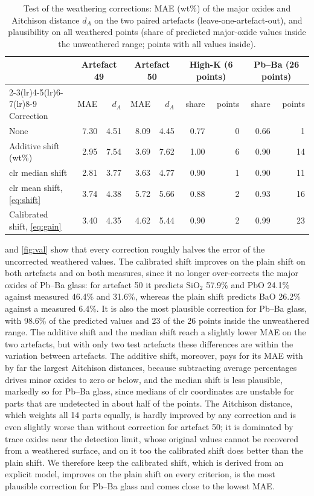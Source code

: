 \documentclass[11pt,a4paper]{article}
\newcommand{\ox}[1]{\ensuremath{\mathrm{#1}}}
\begin{document}
\begin{table}[ht]
\centering
\caption{Test of the weathering corrections: MAE (wt\%) of the major oxides and Aitchison distance $d_A$ on the two paired artefacts (leave-one-artefact-out), and plausibility on all weathered points (share of predicted major-oxide values inside the unweathered range; points with all values inside).}\label{tab:val}
\small
\begin{tabular}{lrrrrrrrr}
\toprule
& \multicolumn{2}{c}{Artefact 49} & \multicolumn{2}{c}{Artefact 50} & \multicolumn{2}{c}{High-K (6 points)} & \multicolumn{2}{c}{Pb--Ba (26 points)} \\
\cmidrule(lr){2-3}\cmidrule(lr){4-5}\cmidrule(lr){6-7}\cmidrule(lr){8-9}
Correction & MAE & $d_A$ & MAE & $d_A$ & share & points & share & points \\
\midrule
None & 7.30 & 4.51 & 8.09 & 4.45 & 0.77 & 0 & 0.66 & 1 \\
Additive shift (wt\%) & 2.95 & 7.54 & 3.69 & 7.62 & 1.00 & 6 & 0.90 & 14 \\
clr median shift & 2.81 & 3.77 & 3.63 & 4.77 & 0.90 & 1 & 0.90 & 11 \\
clr mean shift, \cref{eq:shift} & 3.74 & 4.38 & 5.72 & 5.66 & 0.88 & 2 & 0.93 & 16 \\
Calibrated shift, \cref{eq:gain} & 3.40 & 4.35 & 4.62 & 5.44 & 0.90 & 2 & 0.99 & 23 \\
\bottomrule
\end{tabular}
\end{table}

 and \cref{fig:val} show that every correction roughly halves the error of the uncorrected weathered values.
The calibrated shift improves on the plain shift on both artefacts and on both measures, since it no longer over-corrects the major oxides of Pb--Ba glass: for artefact 50 it predicts \ox{SiO_2} 57.9\% and PbO 24.1\% against measured 46.4\% and 31.6\%, whereas the plain shift predicts BaO 26.2\% against a measured 6.4\%.
It is also the most plausible correction for Pb--Ba glass, with 98.6\% of the predicted values and 23 of the 26 points inside the unweathered range.
The additive shift and the median shift reach a slightly lower MAE on the two artefacts, but with only two test artefacts these differences are within the variation between artefacts.
The additive shift, moreover, pays for its MAE with by far the largest Aitchison distances, because subtracting average percentages drives minor oxides to zero or below, and the median shift is less plausible, markedly so for Pb--Ba glass, since medians of clr coordinates are unstable for parts that are undetected in about half of the points.
The Aitchison distance, which weights all 14 parts equally, is hardly improved by any correction and is even slightly worse than without correction for artefact 50; it is dominated by trace oxides near the detection limit, whose original values cannot be recovered from a weathered surface, and on it too the calibrated shift does better than the plain shift.
We therefore keep the calibrated shift, which is derived from an explicit model, improves on the plain shift on every criterion, is the most plausible correction for Pb--Ba glass and comes close to the lowest MAE.
\end{document}
